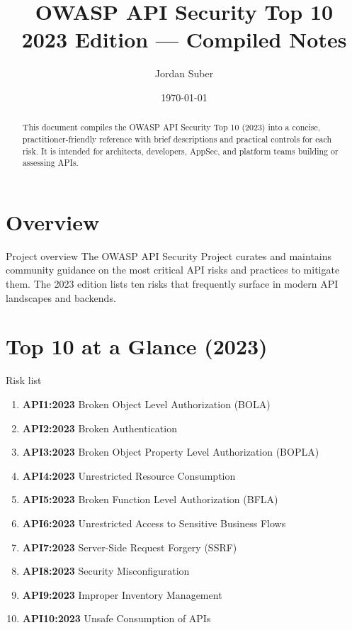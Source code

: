 \documentclass[11pt,a4paper]{article}
\title{\vspace{-0.75em}\textbf{OWASP API Security Top 10}\\[0.25em]\large 2023 Edition — Compiled Notes}
\author{Jordan Suber}
\date{\today}
\begin{document}
\maketitle
\thispagestyle{empty}

\begin{abstract}
This document compiles the OWASP API Security Top 10 (2023) into a concise, practitioner\mbox{-}friendly reference with brief descriptions and practical controls for each risk. It is intended for architects, developers, AppSec, and platform teams building or assessing APIs.
\end{abstract}

\tableofcontents
\newpage

\section{Overview}
\begin{callout}{Project overview}
The OWASP API Security Project curates and maintains community guidance on the most critical API risks and practices to mitigate them. The 2023 edition lists ten risks that frequently surface in modern API landscapes and backends.
\end{callout}

\section{Top 10 at a Glance (2023)}
\begin{callout}{Risk list}
\begin{enumerate}
  \item \textbf{API1:2023} Broken Object Level Authorization (BOLA)
  \item \textbf{API2:2023} Broken Authentication
  \item \textbf{API3:2023} Broken Object Property Level Authorization (BOPLA)
  \item \textbf{API4:2023} Unrestricted Resource Consumption
  \item \textbf{API5:2023} Broken Function Level Authorization (BFLA)
  \item \textbf{API6:2023} Unrestricted Access to Sensitive Business Flows
  \item \textbf{API7:2023} Server\mbox{-}Side Request Forgery (SSRF)
  \item \textbf{API8:2023} Security Misconfiguration
  \item \textbf{API9:2023} Improper Inventory Management
  \item \textbf{API10:2023} Unsafe Consumption of APIs
\end{enumerate}
\end{callout}
\end{document}
